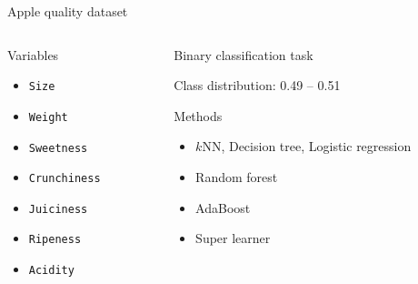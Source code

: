 


\begin{frame}{Apple quality dataset}

\vspace*{-2.5em}\begin{columns}[T]
\begin{column}{0.5\textwidth}
Variables


\begin{itemize}
	\item \texttt{Size}
	\item \texttt{Weight}
	\item \texttt{Sweetness}
	\item \texttt{Crunchiness}
	\item \texttt{Juiciness}
	\item \texttt{Ripeness}
	\item \texttt{Acidity}
\end{itemize}

\end{column}
\hspace*{-2em}%
\begin{column}{0.5\textwidth}
\alert{Binary classification} task%

Class distribution: 0.49 -- 0.51

\vspace{1em}Methods
\begin{itemize}
	\item $k\text{NN}$, Decision tree, Logistic regression
	\item Random forest
	\item AdaBoost
	\item Super learner
\end{itemize}
\end{column}
\end{columns}

\end{frame}

